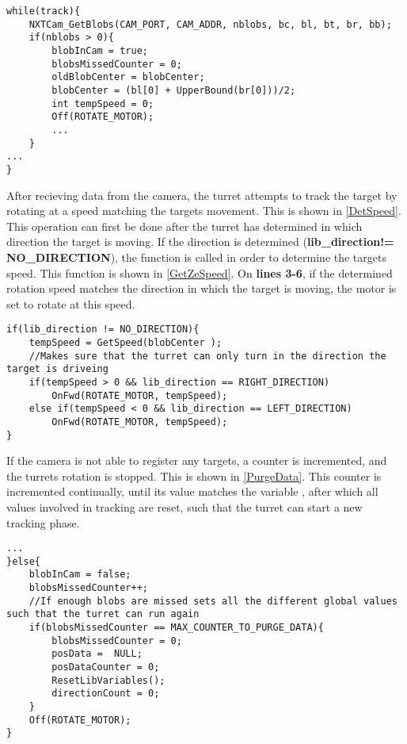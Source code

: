 \begin{minipage}[H]{\linewidth}
\begin{lstlisting}[caption = First part of the general tracking behaviour., label = TrackFirst]
 while(track){
	NXTCam_GetBlobs(CAM_PORT, CAM_ADDR, nblobs, bc, bl, bt, br, bb);
    if(nblobs > 0){
    	blobInCam = true;
        blobsMissedCounter = 0;
        oldBlobCenter = blobCenter;
        blobCenter = (bl[0] + UpperBound(br[0]))/2;
        int tempSpeed = 0;
        Off(ROTATE_MOTOR);
        ...
	}
...
}          
\end{lstlisting}
\end{minipage}

After recieving data from the camera, the turret attempts to track the target by
rotating at a speed matching the targets movement. This is shown in
\autoref{DetSpeed}. This operation can first be done after the turret has
determined in which direction the target is moving. If the direction is
determined (\textbf{lib\_direction!= NO\_DIRECTION}), the 
function is called in order to determine the targets speed. This function is shown in \autoref{GetZeSpeed}.
On \textbf{lines 3-6}, if the determined rotation speed matches the direction in
which the target is moving, the motor is set to rotate at this speed.\nl

\begin{minipage}[H]{\linewidth}
\begin{lstlisting}[caption = Determine the targets speed at rotate to match it, label = DetSpeed] 
if(lib_direction != NO_DIRECTION){
	tempSpeed = GetSpeed(blobCenter );
    //Makes sure that the turret can only turn in the direction the target is driveing
    if(tempSpeed > 0 && lib_direction == RIGHT_DIRECTION)
    	OnFwd(ROTATE_MOTOR, tempSpeed);
    else if(tempSpeed < 0 && lib_direction == LEFT_DIRECTION)
    	OnFwd(ROTATE_MOTOR, tempSpeed);
}
\end{lstlisting}
\end{minipage}

If the camera is not able to register any targets, a counter is incremented, and
the turrets rotation is stopped. This is shown in \autoref{PurgeData}. This
counter is incremented continually, until its value matches the variable
, after which all values involved
in tracking are reset, such that the turret can start a new tracking phase.\nl

\begin{minipage}[H]{\linewidth}
\begin{lstlisting}[caption = Reset data and turn off motor is no targets are found., label = PurgeData] 
...
}else{
	blobInCam = false;
    blobsMissedCounter++;
    //If enough blobs are missed sets all the different global values such that the turret can run again
    if(blobsMissedCounter == MAX_COUNTER_TO_PURGE_DATA){
    	blobsMissedCounter = 0;
        posData =  NULL;
        posDataCounter = 0;
        ResetLibVariables();
        directionCount = 0;
	}
    Off(ROTATE_MOTOR);
}
\end{lstlisting}
\end{minipage}

